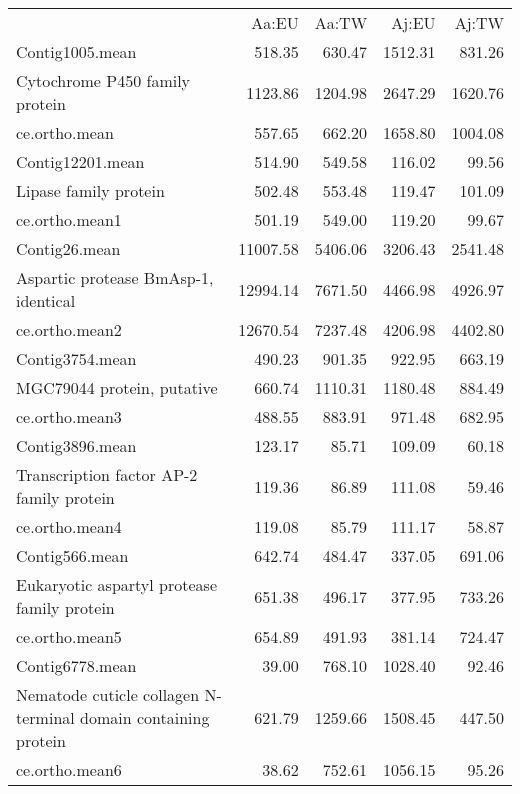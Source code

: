 \begin{table}[ht]
\begin{center}
\begin{tabular}{p{5cm}rrrr}
  & Aa:EU & Aa:TW & Aj:EU & Aj:TW \\ 
 Contig1005.mean & 518.35 & 630.47 & 1512.31 & 831.26 \\ 
  Cytochrome P450 family protein & 1123.86 & 1204.98 & 2647.29 & 1620.76 \\ 
  ce.ortho.mean & 557.65 & 662.20 & 1658.80 & 1004.08 \\ 
   \hline
Contig12201.mean & 514.90 & 549.58 & 116.02 & 99.56 \\ 
  Lipase family protein & 502.48 & 553.48 & 119.47 & 101.09 \\ 
  ce.ortho.mean1 & 501.19 & 549.00 & 119.20 & 99.67 \\ 
   \hline
Contig26.mean & 11007.58 & 5406.06 & 3206.43 & 2541.48 \\ 
  Aspartic protease BmAsp-1, identical & 12994.14 & 7671.50 & 4466.98 & 4926.97 \\ 
  ce.ortho.mean2 & 12670.54 & 7237.48 & 4206.98 & 4402.80 \\ 
   \hline
Contig3754.mean & 490.23 & 901.35 & 922.95 & 663.19 \\ 
  MGC79044 protein, putative & 660.74 & 1110.31 & 1180.48 & 884.49 \\ 
  ce.ortho.mean3 & 488.55 & 883.91 & 971.48 & 682.95 \\ 
   \hline
Contig3896.mean & 123.17 & 85.71 & 109.09 & 60.18 \\ 
  Transcription factor AP-2 family protein & 119.36 & 86.89 & 111.08 & 59.46 \\ 
  ce.ortho.mean4 & 119.08 & 85.79 & 111.17 & 58.87 \\ 
   \hline
Contig566.mean & 642.74 & 484.47 & 337.05 & 691.06 \\ 
  Eukaryotic aspartyl protease family protein & 651.38 & 496.17 & 377.95 & 733.26 \\ 
  ce.ortho.mean5 & 654.89 & 491.93 & 381.14 & 724.47 \\ 
   \hline
Contig6778.mean & 39.00 & 768.10 & 1028.40 & 92.46 \\ 
  Nematode cuticle collagen N-terminal domain containing protein & 621.79 & 1259.66 & 1508.45 & 447.50 \\ 
  ce.ortho.mean6 & 38.62 & 752.61 & 1056.15 & 95.26 \\ 

\end{tabular}
\end{center}
\end{table}
